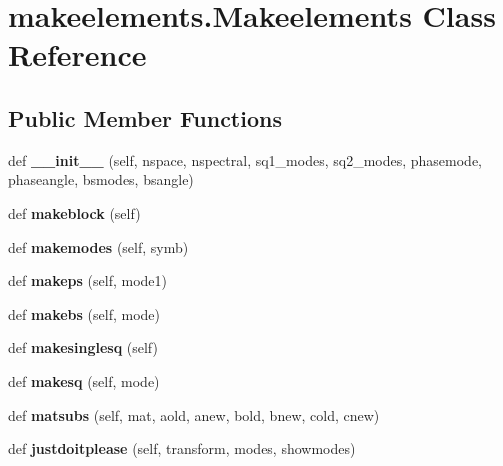 \hypertarget{classmakeelements_1_1Makeelements}{}\section{makeelements.\+Makeelements Class Reference}
\label{classmakeelements_1_1Makeelements}
\subsection*{Public Member Functions}
\begin{DoxyCompactItemize}
\item 
\mbox{\label{classmakeelements_1_1Makeelements_a66054d181becbb95d1e0c67c492a6e1c}} 
def {\bfseries \+\_\+\+\_\+init\+\_\+\+\_\+} (self, nspace, nspectral, sq1\+\_\+modes, sq2\+\_\+modes, phasemode, phaseangle, bsmodes, bsangle)
\item 
\mbox{\label{classmakeelements_1_1Makeelements_a4ee199edcc77bfbd9b907b32197614d4}} 
def {\bfseries makeblock} (self)
\item 
\mbox{\label{classmakeelements_1_1Makeelements_a0c63258f04bbacfdf802b8099601a60f}} 
def {\bfseries makemodes} (self, symb)
\item 
\mbox{\label{classmakeelements_1_1Makeelements_a5c536bae343d8192a20feb8650016dff}} 
def {\bfseries makeps} (self, mode1)
\item 
\mbox{\label{classmakeelements_1_1Makeelements_acf0c829b6232780534fba3e2627ff56c}} 
def {\bfseries makebs} (self, mode)
\item 
\mbox{\label{classmakeelements_1_1Makeelements_a2ac08af9cd3e914684c6f817fa49685f}} 
def {\bfseries makesinglesq} (self)
\item 
\mbox{\label{classmakeelements_1_1Makeelements_abc9e8577ea01f63f9a4bff81dca77326}} 
def {\bfseries makesq} (self, mode)
\item 
\mbox{\label{classmakeelements_1_1Makeelements_ae9e4639afe123d10cd068629c221736a}} 
def {\bfseries matsubs} (self, mat, aold, anew, bold, bnew, cold, cnew)
\item 
\mbox{\label{classmakeelements_1_1Makeelements_adb601ecf80cad0b202a3165b2d863525}} 
def {\bfseries justdoitplease} (self, transform, modes, showmodes)
\end{DoxyCompactItemize}
